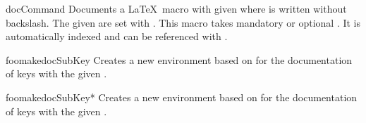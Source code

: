 \begin{docEnvironment}[doclang/environment content=command description,doc updated=2020-04-22]
  {docCommand}{}
Documents a \LaTeX\ macro with given  where  is
written without backslash. The given  are set with .
This macro takes mandatory or optional .
It is automatically indexed and can be referenced with
.
\begin{dispExample}
\begin{docCommand}{foomakedocSubKey}{}
Creates a new environment  based on  for the
documentation of keys with the given .
\end{docCommand}
\end{dispExample}
\begin{dispExample}
\begin{docCommand}[color definition=blue]{foomakedocSubKey*}%
  {}
Creates a new environment  based on  for the
documentation of keys with the given .
\end{docCommand}
\end{dispExample}
\end{docEnvironment}
